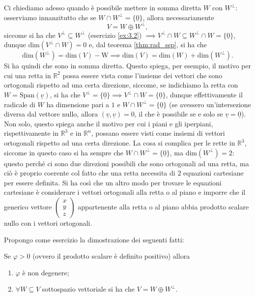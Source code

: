 Ci chiediamo adesso quando è possibile mettere in somma diretta $W$ con $W^\perp$: osserviamo innanzitutto che se $W \cap W^\perp = \{ \underline{0} \}$, allora necessariamente
$$
	V = W \oplus W^\perp,
$$
siccome si ha che $V^\perp \subseteq W^\perp$ (esercizio \ref{ex:3.2}) $\implies V^\perp \cap W \subseteq W^\perp \cap W = \{ \underline{0} \}$, dunque $\text{dim}(V^\perp \cap W) = 0$ e, dal teorema \ref{thm:rad_ssp}, si ha che
$$
	\text{dim}(W^\perp) = \text{dim}(V) - \text{W} \implies \text{dim}(V) = \text{dim}(W) + \text{dim}(W^\perp).
$$
Si ha quindi che sono in somma diretta. Questo spiega, per esempio, il motivo per cui una retta in $\mathbb{R}^2$ possa essere vista come l'insieme dei vettori che sono ortogonali rispetto ad una certa direzione, siccome, se indichiamo la retta con $W = \text{Span}(\underline{v})$, si ha che $V^\perp = \{ \underline{0} \} \implies V^\perp \cap W = \{ \underline{0} \}$, dunque effettivamente
il radicale di $W$ ha dimensione pari a $1$ e $W \cap W^\perp = \{ \underline{0} \}$ (se avessero un'intersezione diversa dal vettore nullo, allora $(\underline{v}, \underline{v}) = 0$, il che è possibile se e solo se $\underline{v} = \underline{0}$). Non solo, questo spiega anche il motivo per cui i piani e gli iperpiani, rispettivamente in $\mathbb{R}^3$ e in $\mathbb{R}^n$, possano essere visti come insiemi di vettori ortogonali rispetto ad una certa direzione.
La cosa si complica per le rette in $\mathbb{R}^3$, siccome in questo caso si ha sempre che $W \cap W^\perp = \{ \underline{0} \}$, ma $\text{dim}(W^\perp) = 2$: questo perché ci sono due direzioni possibili che sono ortogonali ad una retta, ma ciò è proprio coerente col fatto che una retta necessita di $2$ equazioni cartesiane per essere definita. Si ha così che un altro modo per trovare le equazioni cartesiane è considerare i vettori ortogonali alla retta o al piano e imporre che il generico vettore $\begin{pmatrix} x \\ y \\ z \end{pmatrix}$ appartenente alla retta o al piano abbia prodotto scalare
nullo con i vettori ortogonali. 

Propongo come esercizio la dimostrazione dei seguenti fatti:
\begin{exercise}
	Se $\varphi > 0$ (ovvero il prodotto scalare è definito positivo) allora 
	\begin{enumerate}
		\item $\varphi$ è non degenere;
		\item $\forall W \subseteq V$ sottospazio vettoriale si ha che $V = W \oplus W^\perp$.		
	\end{enumerate}
\end{exercise}

